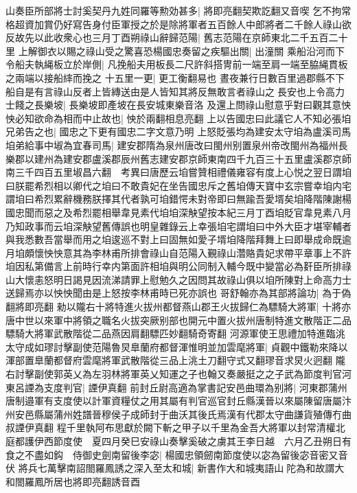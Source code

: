山奏臣所部將士討奚契丹九姓同羅等勲効甚多|{
	將即亮翻契欺訖翻又音喫}
乞不拘常格超資加賞仍好寫告身付臣軍授之於是除將軍者五百餘人中郎將者二千餘人祿山欲反故先以此收衆心也三月丁酉朔祿山辭歸范陽|{
	舊志范陽在京師東北二千五百二十里}
上解御衣以賜之祿山受之驚喜恐楊國忠奏留之疾驅出關|{
	出潼關}
乘船沿河而下令船夫執䋲板立於岸側|{
	凡挽船夫用板長二尺許斜搭冑前一端至肩一端至脇䋲貫板之兩端以接船繂而挽之}
十五里一更|{
	更工衡翻易也}
晝夜兼行日數百里過郡縣不下船自是有言祿山反者上皆縳送由是人皆知其將反無敢言者祿山之長安也上令高力士餞之長樂坡|{
	長樂坡即產坡在長安城東樂音洛}
及還上問祿山慰意乎對曰觀其意怏怏必知欲命為相而中止故也|{
	怏於兩翻相息亮翻}
上以告國忠曰此議它人不知必張垍兄弟告之也|{
	國忠之下更有國忠二字文意乃明}
上怒貶張均為建安太守垍為盧溪司馬垍弟給事中埱為宜春司馬|{
	建安郡隋為泉州唐改曰閩州别置泉州帝改閩州為福州長樂郡以建州為建安郡盧溪郡辰州舊志建安郡京師東南四千九百三十五里盧溪郡京師南三千四百五里埱昌六翻　考異曰唐歷云垍嘗贊相禮儀雍容有度上心悦之翌日謂垍曰朕罷希烈相以卿代之垍曰不敢貴妃在坐告國忠斥之舊垍傳天寶中玄宗嘗幸垍内宅謂垍曰希烈累辭機務朕擇其代者孰可垍錯愕未對帝即曰無踰吾愛壻矣垍降階陳謝楊國忠聞而惡之及希烈罷相舉韋見素代垍垍深觖望按本紀三月丁酉垍貶官韋見素八月乃知政事而云垍深觖望舊傳誤也明皇雜錄云上幸張垍宅謂垍曰中外大臣才堪宰輔者與我悉數吾當舉而用之垍逡巡不對上曰固無如愛子壻垍降階拜舞上曰即舉成命既逾月垍頗懷怏怏意其為李林甫所排會祿山自范陽入覲祿山濳賂貴妃求帶平章事上不許垍因私第備言上前時行幸内第面許相垍與明公同制入輔今既中變當必為姧臣所排祿山大懷恚怒明日謁見因流涕請罪上慰勉久之因問其故祿山俱以垍所陳對上命高力士送歸焉亦以怏怏聞由是上怒按李林甫時已死亦誤也}
哥舒翰亦為其部將論功|{
	為于偽翻將即亮翻}
勑以隴右十將特進火拔州都督燕山郡王火拔歸仁為驃騎大將軍|{
	十將亦唐中世以來軍中將領之職名火拔突厥别部也開元中置火拔州唐制特進文散階正二品驃騎大將軍武散階從二品燕因肩翻驃匹妙翻騎奇寄翻}
河源軍使王思禮加特進臨洮太守成如璆討擊副使范陽魯炅臯蘭府都督渾惟明並加雲麾將軍|{
	貞觀中鐵勒來降以渾部置臯蘭都督府雲麾將軍武散階從三品上洮土刀翻守式又翻璆音求炅火迥翻}
隴右討擊副使郭英乂為左羽林將軍英乂知運之子也翰又奏嚴挺之之子武為節度判官河東呂諲為支度判官|{
	諲伊真翻}
前封丘尉高適為掌書記安邑曲環為别將|{
	河東郡蒲州唐制邉軍有支度使以計軍資糧仗之用其屬有判官巡官封丘縣漢晉以來屬陳留唐屬汴州安邑縣屬蒲州姓譜晉穆侯子成師封于曲沃其後氏焉漢有代郡太守曲謙貨殖傳冇曲叔諲伊真翻}
程千里執阿布思獻於闕下斬之甲子以千里為金吾大將軍以封常清權北庭都護伊西節度使　夏四月癸巳安祿山奏擊奚破之虜其王李日越　六月乙丑朔日有食之不盡如鈎　侍御史劍南留後李宓|{
	楊國忠領劒南節度使以宓為留後宓音密又音伏}
將兵七萬擊南詔閤羅鳳誘之深入至太和城|{
	新書作大和城夷語山陀為和故謂大和閤羅鳳所居也將即亮翻誘音酉}
